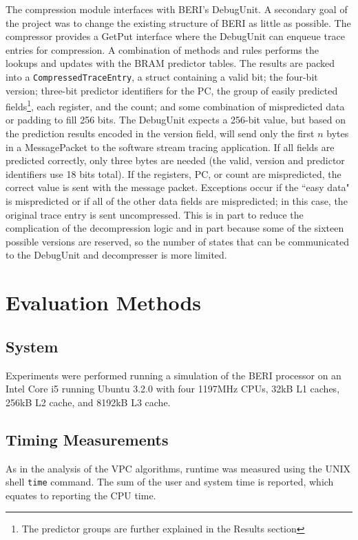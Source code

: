 \documentclass[conference]{IEEEtran}
\begin{document}
The compression module interfaces with BERI's DebugUnit. A secondary goal of the project was to change the existing structure of BERI as little as possible. The compressor provides a GetPut interface where the DebugUnit can enqueue trace entries for compression. A combination of methods and rules performs the lookups and updates with the BRAM predictor tables. The results are packed into a \texttt{CompressedTraceEntry}, a struct containing a valid bit; the four-bit version; three-bit predictor identifiers for the PC, the group of easily predicted fields\footnote{The predictor groups are further explained in the Results section}, each register, and the count; and some combination of mispredicted data or padding to fill 256 bits. The DebugUnit expects a 256-bit value, but based on the prediction results encoded in the version field, will send only the first $n$ bytes in a MessagePacket to the software stream tracing application. If all fields are predicted correctly, only three bytes are needed (the valid, version and predictor identifiers use 18 bits total). If the registers, PC, or count are mispredicted, the correct value is sent with the message packet. Exceptions occur if the ``easy data" is mispredicted or if all of the other data fields are mispredicted; in this case, the original trace entry is sent uncompressed. This is in part to reduce the complication of the decompression logic and in part because some of the sixteen possible versions are reserved, so the number of states that can be communicated to the DebugUnit and decompresser is more limited.  

\section{Evaluation Methods}
\subsection{System}
Experiments were performed running a simulation of the BERI processor on an Intel Core i5 running Ubuntu 3.2.0 with four 1197MHz CPUs, 32kB L1 caches, 256kB L2 cache, and 8192kB L3 cache. 
\subsection{Timing Measurements}
As in the analysis of the VPC algorithms, runtime was measured using the UNIX shell \texttt{time} command. The sum of the user and system time is reported, which equates to reporting the CPU time. 
\end{document}
